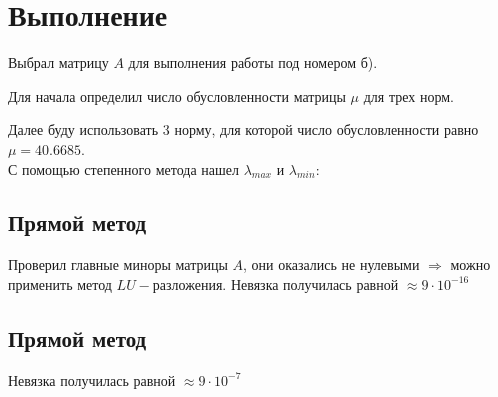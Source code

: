 \documentclass[a4paper,11.5pt]{article} %
\begin{document}
    \section{Выполнение}
    Выбрал матрицу $A$ для выполнения работы под номером б).
    \begin{figure}[H]
	\end{figure}
    Для начала определил число обусловленности матрицы $\mu$ для трех норм.
    \begin{figure}[H]
	\end{figure}
    Далее буду использовать 3 норму, для которой число обусловленности равно $\mu = 40.6685$.
    \\
    С помощью степенного метода нашел $\lambda_{max}$ и $\lambda_{min}$:
    \begin{figure}[H]
	\end{figure}

    \subsection{Прямой метод}
    Проверил главные миноры матрицы $A$, они оказались не нулевыми $\Rightarrow$ можно применить метод $LU-$разложения.
    Невязка получилась равной $\approx 9 \cdot 10^{-16}$
    
    \subsection{Прямой метод}
    Невязка получилась равной $\approx 9 \cdot 10^{-7}$

    
\end{document}

